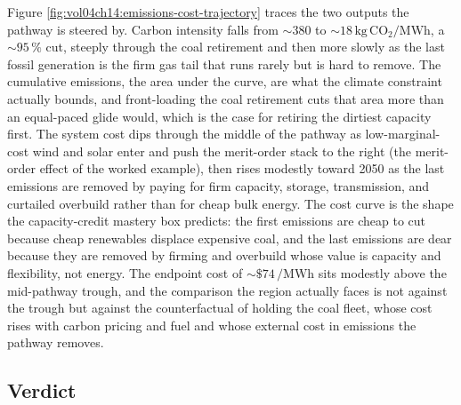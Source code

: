 Figure \ref{fig:vol04ch14:emissions-cost-trajectory} traces the two
outputs the pathway is steered by. Carbon intensity falls from $\sim 380$
to $\sim 18\,\si{\kilogram}\,\text{CO}_2/\si{\mega\watt\hour}$, a $\sim
95\,\%$ cut, steeply through the coal retirement and then more slowly as
the last fossil generation is the firm gas tail that runs rarely but is
hard to remove. The cumulative emissions, the area under the curve, are
what the climate constraint actually bounds, and front-loading the coal
retirement cuts that area more than an equal-paced glide would, which is the
case for retiring the dirtiest capacity first. The system cost dips through
the middle of the pathway as low-marginal-cost wind and solar enter and
push the merit-order stack to the right (the merit-order effect of the
worked example), then rises modestly toward 2050 as the last emissions are
removed by paying for firm capacity, storage, transmission, and curtailed
overbuild rather than for cheap bulk energy. The cost curve is the
shape the capacity-credit mastery box predicts: the first emissions are
cheap to cut because cheap renewables displace expensive coal, and the last
emissions are dear because they are removed by firming and overbuild whose
value is capacity and flexibility, not energy. The endpoint cost of $\sim
\$74\,\si{\per\mega\watt\hour}$ sits modestly above the mid-pathway trough,
and the comparison the region actually faces is not against the trough but
against the counterfactual of holding the coal fleet, whose cost rises with
carbon pricing and fuel and whose external cost in emissions the pathway
removes.

\subsection{Verdict}


